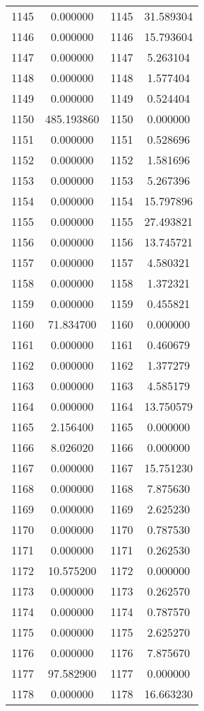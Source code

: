 \documentclass[12pt]{article}
\begin{document}
\begin{longtable}{@{}cccc@{}}
1145 & 0.000000 & 1145 & 31.589304 \\
1146 & 0.000000 & 1146 & 15.793604 \\
1147 & 0.000000 & 1147 & 5.263104 \\
1148 & 0.000000 & 1148 & 1.577404 \\
1149 & 0.000000 & 1149 & 0.524404 \\
1150 & 485.193860 & 1150 & 0.000000 \\
1151 & 0.000000 & 1151 & 0.528696 \\
1152 & 0.000000 & 1152 & 1.581696 \\
1153 & 0.000000 & 1153 & 5.267396 \\
1154 & 0.000000 & 1154 & 15.797896 \\
1155 & 0.000000 & 1155 & 27.493821 \\
1156 & 0.000000 & 1156 & 13.745721 \\
1157 & 0.000000 & 1157 & 4.580321 \\
1158 & 0.000000 & 1158 & 1.372321 \\
1159 & 0.000000 & 1159 & 0.455821 \\
1160 & 71.834700 & 1160 & 0.000000 \\
1161 & 0.000000 & 1161 & 0.460679 \\
1162 & 0.000000 & 1162 & 1.377279 \\
1163 & 0.000000 & 1163 & 4.585179 \\
1164 & 0.000000 & 1164 & 13.750579 \\
1165 & 2.156400 & 1165 & 0.000000 \\
1166 & 8.026020 & 1166 & 0.000000 \\
1167 & 0.000000 & 1167 & 15.751230 \\
1168 & 0.000000 & 1168 & 7.875630 \\
1169 & 0.000000 & 1169 & 2.625230 \\
1170 & 0.000000 & 1170 & 0.787530 \\
1171 & 0.000000 & 1171 & 0.262530 \\
1172 & 10.575200 & 1172 & 0.000000 \\
1173 & 0.000000 & 1173 & 0.262570 \\
1174 & 0.000000 & 1174 & 0.787570 \\
1175 & 0.000000 & 1175 & 2.625270 \\
1176 & 0.000000 & 1176 & 7.875670 \\
1177 & 97.582900 & 1177 & 0.000000 \\
1178 & 0.000000 & 1178 & 16.663230 \\

\end{longtable}
\end{document}
